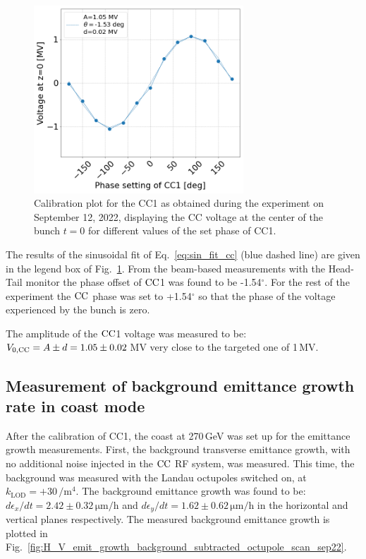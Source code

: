 \begin{figure}[!h] %
   \centering         
   \includegraphics[width=0.7\textwidth]{images/Ch8/Vcc_at_z_zero_vs_inspector_phase_CC1_for_thesis_new_xlabel_sep22.png}
       \caption{Calibration plot for the CC1 as obtained during the experiment on September 12, 2022, displaying the CC voltage at the center of the bunch $t=0$ for different values of the set phase of CC1.}
       \label{fig:Vcc_calibration_md_sep2022}
\end{figure}

The results of the sinusoidal fit of Eq.~\eqref{eq:sin_fit_cc} (blue dashed line) are given in the legend box of Fig.~\ref{fig:Vcc_calibration_md_sep2022}. From the beam-based measurements with the Head-Tail monitor the phase offset of ${\mathrm{CC}}$1 was found to be -1.54$^\circ$. For the rest of the experiment the ${\mathrm{CC}}$ phase was set to +1.54$^\circ$ so that the phase of the voltage experienced by the bunch is zero. 

The amplitude of the ${\mathrm{CC}}$1 voltage was measured to be: ${V_\mathrm{0, CC}}=A \pm d = 1.05 \pm 0.02$\,MV very close to the targeted one of 1\,MV.

\subsection{Measurement of background emittance growth rate in coast mode}
After the calibration of CC1, the coast at 270\,GeV was set up for the emittance growth measurements. First, the background transverse emittance growth, with no additional noise injected in the ${\mathrm{CC}}$ RF system, was measured. This time, the background was measured with the Landau octupoles switched on, at $k_\mathrm{LOD}=+30$\,$\mathrm{/m^4}$. The background emittance growth was found to be: $d\epsilon_x/dt=2.42 \pm 0.32$\,$\mathrm{\mu m/h}$ and $d\epsilon_y/dt=1.62 \pm 0.62$\,$\mathrm{\mu m/h}$ in the horizontal and vertical planes respectively. The measured background emittance growth is plotted in Fig.~\ref{fig:H_V_emit_growth_background_subtracted_octupole_scan_sep22}.

